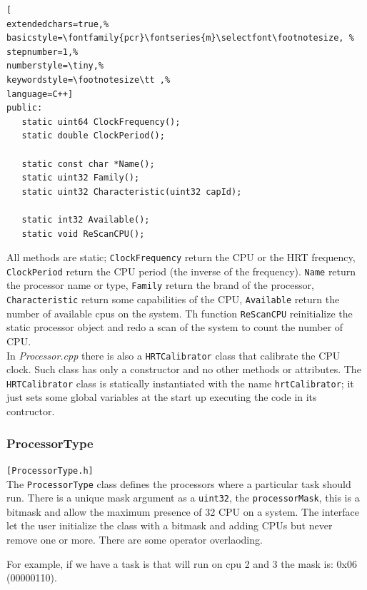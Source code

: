 \begin{lstlisting}[
extendedchars=true,%
basicstyle=\fontfamily{pcr}\fontseries{m}\selectfont\footnotesize, %
stepnumber=1,%
numberstyle=\tiny,%
keywordstyle=\footnotesize\tt ,%
language=C++]
public:
   static uint64 ClockFrequency();
   static double ClockPeriod();

   static const char *Name();
   static uint32 Family();
   static uint32 Characteristic(uint32 capId);

   static int32 Available();
   static void ReScanCPU();
\end{lstlisting}

All methods are static; \texttt{ClockFrequency} return the CPU or the HRT frequency, \texttt{ClockPeriod} return the CPU period (the inverse of the frequency). \texttt{Name} return the processor name or type, \texttt{Family} return the brand of the processor, \texttt{Characteristic} return some capabilities of the CPU, \texttt{Available} return the number of available cpus on the system.
Th function \texttt{ReScanCPU} reinitialize the static processor object and redo a scan of the system to count the number of CPU.\\


In \textit{Processor.cpp} there is also a \texttt{HRTCalibrator} class that calibrate the CPU clock. Such class has only a constructor and no other methods or attributes. The \texttt{HRTCalibrator} class is statically instantiated with the name \texttt{hrtCalibrator}; it just sets some global variables at the start up executing the code in its contructor. \\



\subsubsection{ProcessorType}
\texttt{[ProcessorType.h]}\\
The \texttt{ProcessorType} class defines the processors where a particular task should run. There is a unique mask argument as a \texttt{uint32}, the \texttt{processorMask}, this is a bitmask and allow the maximum presence of 32 CPU on a system.
The interface let the user initialize the class with a bitmask and adding CPUs but never remove one or more. There are some operator overlaoding.


For example, if we have a task is that will run on cpu 2 and 3 the mask is: 0x06 (00000110).


